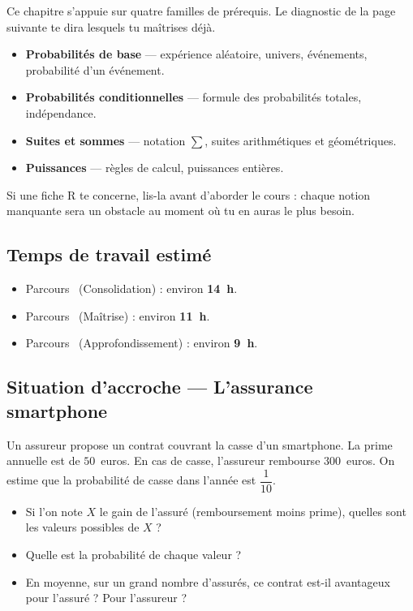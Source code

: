 Ce chapitre s'appuie sur quatre familles de prérequis. Le diagnostic de la page suivante te dira lesquels tu maîtrises déjà.

\begin{itemize}
  \item[\textbf{R1}] \textbf{Probabilités de base} — expérience aléatoire, univers, événements, probabilité d'un événement.
  \item[\textbf{R2}] \textbf{Probabilités conditionnelles} — formule des probabilités totales, indépendance.
  \item[\textbf{R4}] \textbf{Suites et sommes} — notation $\sum$, suites arithmétiques et géométriques.
  \item[\textbf{R5}] \textbf{Puissances} — règles de calcul, puissances entières.
\end{itemize}

Si une fiche R te concerne, lis-la avant d'aborder le cours : chaque notion manquante sera un obstacle au moment où tu en auras le plus besoin.

\subsection*{Temps de travail estimé}

\begin{itemize}
  \item Parcours~\parcoursUn{} (Consolidation) : environ \textbf{14~h}.
  \item Parcours~\parcoursDeux{} (Maîtrise) : environ \textbf{11~h}.
  \item Parcours~\parcoursTrois{} (Approfondissement) : environ \textbf{9~h}.
\end{itemize}

\subsection*{Situation d'accroche — L'assurance smartphone}

Un assureur propose un contrat couvrant la casse d'un smartphone. La prime annuelle est de $50$~euros. En cas de casse, l'assureur rembourse $300$~euros. On estime que la probabilité de casse dans l'année est $\dfrac{1}{10}$.

\begin{itemize}
  \item Si l'on note $X$ le gain de l'assuré (remboursement moins prime), quelles sont les valeurs possibles de $X$ ?
  \item Quelle est la probabilité de chaque valeur ?
  \item En moyenne, sur un grand nombre d'assurés, ce contrat est-il avantageux pour l'assuré ? Pour l'assureur ?
\end{itemize}

